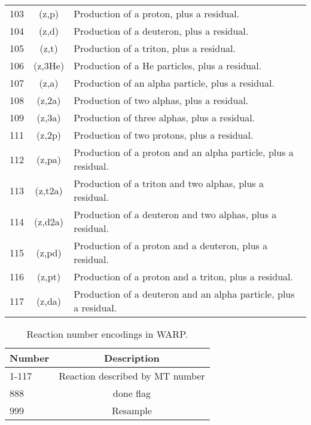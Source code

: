 \begin{table}[h]
\begin{tabular}{| l | c | l |}
103	& (z,p)	   & Production of a proton, plus a residual.          \\
104	& (z,d)	   & Production of a deuteron, plus a residual.        \\
105	& (z,t)	   & Production of a triton, plus a residual.          \\
106	& (z,3He)	&    Production of a He particles, plus a residual.  \\
107	& (z,a)	  &  Production of an alpha particle, plus a residual. \\
108	& (z,2a)	& Production of two alphas, plus a residual.	\\
109	& (z,3a)	& Production of three alphas, plus a residual.	\\
111	& (z,2p)	& Production of two protons, plus a residual.	\\
112	& (z,pa)	& Production of a proton and an alpha particle, plus a residual.	\\
113	& (z,t2a)	& Production of a triton and two alphas, plus a residual.	\\
114	& (z,d2a)	& Production of a deuteron and two alphas, plus a residual.	\\
115	& (z,pd)	& Production of a proton and a deuteron, plus a residual.	\\
116	& (z,pt)	& Production of a proton and a triton, plus a residual.	\\
117	& (z,da)	& Production of a deuteron and an alpha particle, plus a residual.	\\
\hline
\end{tabular}
\end{table}

\begin{table}[h]
\centering
\caption{Reaction number encodings in WARP.}
\label{WARP_numbers}
\begin{tabular}{| l c |}
\hline
Number &  Description \\
\hline
1-117	  &   Reaction described by MT number  \\
888 	& done flag \\
999	&   Resample	\\
\hline
\end{tabular}
\end{table}